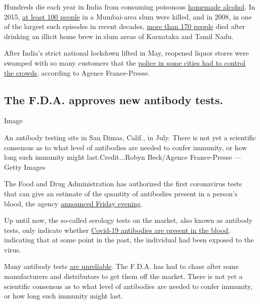 Hundreds die each year in India from consuming poisonous
\href{https://www.nytimes3xbfgragh.onion/2019/02/11/world/asia/india-toxic-alcohol.html}{homemade
alcohol}. In 2015,
\href{https://www.bbc.com/news/world-asia-india-33224514}{at least 100
people} in a Mumbai-area slum were killed, and in 2008, in one of the
largest such episodes in recent decades,
\href{https://timesofindia.indiatimes.com/city/chennai/TN-hooch-tragedy-21-cops-suspended/articleshow/3159848.cms?referral=PM}{more
than 170 people} died after drinking an illicit home brew in slum areas
of Karnataka and Tamil Nadu.

After India's strict national lockdown lifted in May, reopened liquor
stores were swamped with so many customers that the
\href{https://news.yahoo.com/chaos-outside-liquor-stores-india-eases-virus-lockdown-112326078.html}{police
in some cities had to control the crowds}, according to Agence
France-Presse.

\hypertarget{the-fda-approves-new-antibody-tests}{%
\subsection{The F.D.A. approves new antibody
tests.}\label{the-fda-approves-new-antibody-tests}}

Image

An antibody testing site in San Dimas, Calif., in July. There is not yet
a scientific consensus as to what level of antibodies are needed to
confer immunity, or how long such immunity might last.Credit...Robyn
Beck/Agence France-Presse --- Getty Images

The Food and Drug Administration has authorized the first coronavirus
tests that can give an estimate of the quantity of antibodies present in
a person's blood, the agency
\href{https://www.fda.gov/news-events/press-announcements/coronavirus-covid-19-update-fda-authorizes-first-tests-estimate-patients-antibodies-past-sars-cov-2}{announced
Friday evening}.

Up until now, the so-called serology tests on the market, also known as
antibody tests, only indicate whether
\href{https://www.nytimes3xbfgragh.onion/2020/07/26/health/coronvirus-antibody-tests.html}{Covid-19
antibodies are present in the blood}, indicating that at some point in
the past, the individual had been exposed to the virus.

Many antibody tests
\href{https://www.nytimes3xbfgragh.onion/2020/05/04/health/fda-antibody-tests-coronavirus.html}{are
unreliable}. The F.D.A. has had to chase after some manufacturers and
distributors to get them off the market. There is not yet a scientific
consensus as to what level of antibodies are needed to confer immunity,
or how long such immunity might last.

